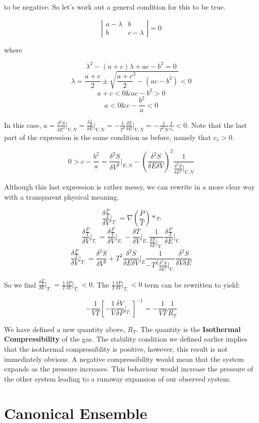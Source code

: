 \documentclass{article}
\newcommand{\secpardif}[2]{\frac{\delta^{2}#1}{\delta#2^{2}}}
\newcommand{\thermdif}[4]{\frac{\delta#1}{\delta#2}\vert_{#3,#4}}
\newcommand{\secthermdif}[4]{\frac{\delta^{2}#1}{\delta#2^{2}}\vert_{#3,#4}}
\begin{document}
to be negative.  So let's work out a general condition for this to be true.

$$\left| \begin{smallmatrix} a-\lambda&b\\ b&c-\lambda \end{smallmatrix} \right|=0$$

where

$$\lambda^{2}-(a+c)\lambda+ac-b^{2}=0$$
$$\lambda=\frac{a+c}{2}\pm\sqrt{\frac{a+c}{2}^{2}-(ac-b^{2})}<0$$
$$a+c<0 \& ac-b^{2}>0$$
$$a<0 \& c-\frac{b^{2}}{a}<0$$

In this case, $a=\secthermdif{S}{E}{V}{N}=\thermdif{\frac{1}{T}}{E}{V}{N}=-\frac{1}{T^{2}}\thermdif{T}{E}{V}{N}=-\frac{1}{T^{2}N}\frac{1}{c_{v}}<0$.  Note that the last part of the expression is the same condition as before, namely that $c_{v}>0$.

$$0>c-\frac{b^{2}}{a}=\secthermdif{S}{V}{E}{N}-(\frac{\delta^{2}S}{\delta E\delta V})^{2}\frac{1}{\secthermdif{S}{E}{V}{N}}$$


Although this last expression is rather messy, we can rewrite in a more clear way with a transparent physical meaning.

$$\thermdif{\frac{P}{T}}{V}{T}{ }=\nabla(\frac{P}{T})*\mathbb{n}$$
$$\thermdif{\frac{P}{T}}{V}{T}{ }=\thermdif{\frac{P}{T}}{V}{E}{ }-\thermdif{T}{V}{E}{ }\frac{1}{\thermdif{T}{E}{V}{ }}\thermdif{\frac{P}{T}}{E}{V}{ }$$
$$\thermdif{\frac{P}{T}}{V}{T}{ }=\secpardif{S}{V}+T^{2}\frac{\delta^{2}S}{\delta E\delta V}\vert_{E}\frac{1}{-T^{2}\secthermdif{S}{E}{V}{ }}\frac{\delta^{2}S}{\delta V\delta E}$$  

So we find $\thermdif{\frac{P}{T}}{V}{T}{ }=\frac{1}{T}\thermdif{P}{V}{T}{ }<0$.  The $\frac{1}{T}\thermdif{P}{V}{T}{ }<0$ term can be rewritten to yield:

$$-\frac{1}{VT}[-\frac{1}{V}\thermdif{V}{P}{T}{ }]^{-1}=-\frac{1}{VT}\frac{1}{R_{T}}$$
	
We have defined a new quantity above, $R_{T}$.  The quantity is the \textbf{Isothermal Compressibility} of the gas.  The stability condition we defined earlier implies that the isothermal compressiblity is positive, however, this result is not immediately obvious.  A negative compressibility would mean that the system expands as the pressure increases.  This behaviour would increase the pressure of the other system leading to a runaway expansion of our observed system.

\part{Canonical Ensemble}
\end{document}
